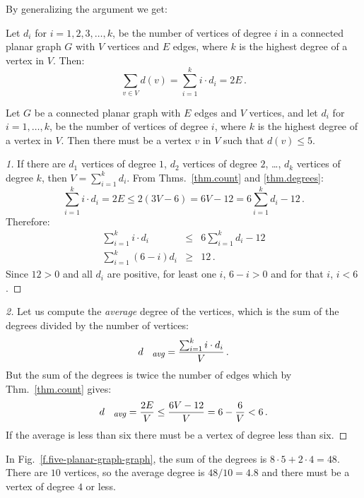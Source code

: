 \newpage

By generalizing the argument we get:
\begin{theorem}\label{thm.degrees}
Let $d_i$ for $i=1,2,3,\ldots,k$, be the number of vertices of degree $i$ in a connected planar graph $G$ with $V$ vertices and $E$ edges, where $k$ is the highest degree of a vertex in $V$. Then:
\[
\sum_{v\in V} d(v) =\sum_{i=1}^{k} i\cdot d_i=2E\,.
\]
\end{theorem}

\begin{theorem}\label{thm.degree5}
Let $G$ be a connected planar graph with $E$ edges and $V$ vertices, and let $d_i$ for $i=1,\ldots,k$, be the number of vertices of degree $i$, where $k$ is the highest degree of a vertex in $V$. Then there must be a vertex $v$ in $V$ such that $d(v) \leq 5$.
\end{theorem}

\begin{proof}[1]
If there are $d_1$ vertices of degree $1$, $d_2$ vertices of degree $2$, \ldots, $d_k$ vertices of degree $k$, then $V=\sum_{i=1}^{k}d_i$.  From Thms.~\ref{thm.count} and \ref{thm.degrees}:
\[
\sum_{i=1}^{k} i\cdot d_i=2E\leq 2(3V-6) = 6V-12=6\sum_{i=1}^{k} d_i -12\,.
\]
Therefore:
%
\begin{eqnarray*}
\sum_{i=1}^{k} i\cdot d_i &\leq& 6\sum_{i=1}^{k} d_i -12\\
\sum_{i=1}^{k} (6-i)d_i&\geq& 12\,.
\end{eqnarray*}
Since $12>0$ and all $d_i$ are positive, for least one $i$, $6-i>0$ and for that $i$, $i<6$.
\end{proof}

\begin{proof}[2]
Let us compute the \emph{average} degree of the vertices, which is the sum of the degrees divided by the number of vertices:
\[
d_{\textit{\footnotesize avg}}=\frac{\sum_{i=1}^{k} i\cdot d_i}{V}\,.
\]
But the sum of the degrees is twice the number of edges which by Thm.~\ref{thm.count} gives:
\[
d_{\textit{\footnotesize avg}}=\frac{2E}{V}\leq \frac{6V-12}{V}=6-\frac{6}{V}<6\,.
\]
If the average is less than six there must be a vertex of degree less than six.
\end{proof}

\begin{example}
In Fig.~\ref{f.five-planar-graph-graph}, the sum of the degrees is $8\cdot 5 + 2\cdot 4=48$. There are $10$ vertices, so the average degree is $48/10=4.8$ and there must be a vertex of degree $4$ or less.
\end{example}

